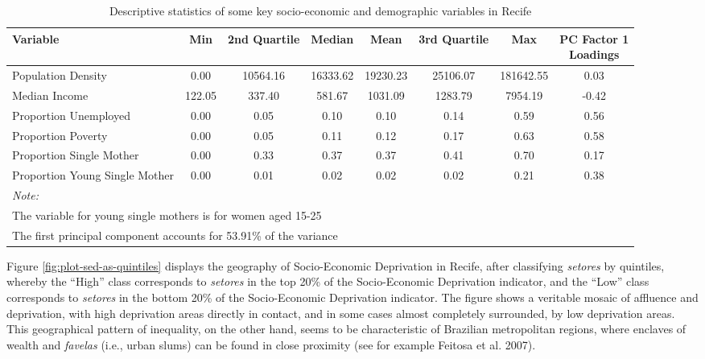 \documentclass[smallextended]{svjour3}       %
\begin{document}
\begin{table}

\caption{\label{tab:table-sed-descriptive-statistics}\label{tab:sed-descriptive-statistics}Descriptive statistics of some key socio-economic and demographic variables in Recife}
\centering
\begin{tabular}[t]{lccccccc}
\toprule
Variable & Min & 2nd Quartile & Median & Mean & 3rd Quartile & Max & \makecell[l]{PC Factor 1\\ Loadings}\\
\midrule
Population Density & 0.00 & 10564.16 & 16333.62 & 19230.23 & 25106.07 & 181642.55 & 0.03\\
Median Income & 122.05 & 337.40 & 581.67 & 1031.09 & 1283.79 & 7954.19 & -0.42\\
Proportion Unemployed & 0.00 & 0.05 & 0.10 & 0.10 & 0.14 & 0.59 & 0.56\\
Proportion Poverty & 0.00 & 0.05 & 0.11 & 0.12 & 0.17 & 0.63 & 0.58\\
Proportion Single Mother & 0.00 & 0.33 & 0.37 & 0.37 & 0.41 & 0.70 & 0.17\\
\addlinespace
Proportion Young Single Mother & 0.00 & 0.01 & 0.02 & 0.02 & 0.02 & 0.21 & 0.38\\
\bottomrule
\multicolumn{8}{l}{\textit{Note: }}\\
\multicolumn{8}{l}{The variable for young single mothers is for women aged 15-25}\\
\multicolumn{8}{l}{The first principal component accounts for 53.91\% of the variance}\\
\end{tabular}
\end{table}

Figure \ref{fig:plot-sed-as-quintiles} displays the geography of
Socio-Economic Deprivation in Recife, after classifying \emph{setores}
by quintiles, whereby the ``High'' class corresponds to \emph{setores}
in the top 20\% of the Socio-Economic Deprivation indicator, and the
``Low'' class corresponds to \emph{setores} in the bottom 20\% of the
Socio-Economic Deprivation indicator. The figure shows a veritable
mosaic of affluence and deprivation, with high deprivation areas
directly in contact, and in some cases almost completely surrounded, by
low deprivation areas. This geographical pattern of inequality, on the
other hand, seems to be characteristic of Brazilian metropolitan
regions, where enclaves of wealth and \emph{favelas} (i.e., urban slums)
can be found in close proximity (see for example Feitosa et al. 2007).
\end{document}
